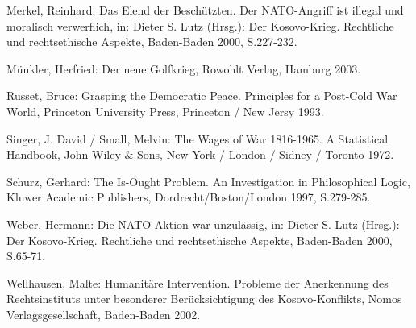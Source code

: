 \documentclass[12pt,a4paper,ngerman]{article}
\begin{document}
{Merkel, Reinhard: Das Elend der Beschützten. Der NATO-Angriff ist
illegal und moralisch verwerflich, in: Dieter S. Lutz (Hrsg.): Der
Kosovo-Krieg.  Rechtliche und rechtsethische Aspekte, Baden-Baden
2000, S.227-232.

Münkler, Herfried: Der neue Golfkrieg, Rowohlt Verlag, Hamburg 2003.

Russet, Bruce: Grasping the Democratic Peace. Principles for a
Post-Cold War World, Princeton University Press, Princeton / New Jersy
1993.

Singer, J. David / Small, Melvin: The Wages of War 1816-1965. A
Statistical Handbook, John Wiley \& Sons, New York / London / Sidney /
Toronto 1972.

Schurz, Gerhard: The Is-Ought Problem. An Investigation in
Philosophical Logic, Kluwer Academic Publishers,
Dordrecht/Boston/London 1997, S.279-285.

Weber, Hermann: Die NATO-Aktion war unzulässig, in: Dieter S. Lutz
(Hrsg.): Der Kosovo-Krieg. Rechtliche und rechtsethische Aspekte,
Baden-Baden 2000, S.65-71.

Wellhausen, Malte: Humanitäre Intervention. Probleme der Anerkennung
des Rechtsinstituts unter besonderer Berücksichtigung des
Kosovo-Konflikts, Nomos Verlagsgesellschaft, Baden-Baden 2002.

}
\end{document}

